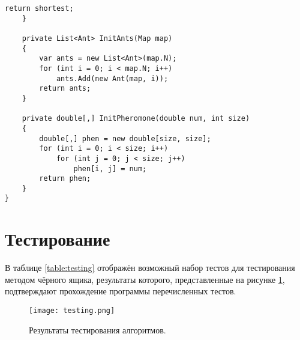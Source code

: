 \begin{lstlisting}[language={[Sharp]C}, label=lst:ant, caption=Реализация муравьиного алгоритма]
        return shortest;
    }

    private List<Ant> InitAnts(Map map)
    {
        var ants = new List<Ant>(map.N);
        for (int i = 0; i < map.N; i++)
            ants.Add(new Ant(map, i));
        return ants;
    }

    private double[,] InitPheromone(double num, int size)
    {
        double[,] phen = new double[size, size];
        for (int i = 0; i < size; i++)
            for (int j = 0; j < size; j++)
                phen[i, j] = num;
        return phen;
    }
}
        \end{lstlisting}
    
        
    \section{Тестирование}
        В таблице \ref{table:testing} отображён возможный набор тестов
        для тестирования методом чёрного ящика, результаты которого, 
        представленные на рисунке \ref{png:testing:result}, подтверждают
        прохождение программы перечисленных тестов.
        
        \begin{figure}[h!]
            \centering
            \texttt{[image: testing.png]}
            \caption{Результаты тестирования алгоритмов.}
            \label{png:testing:result}
        \end{figure}
\newpage